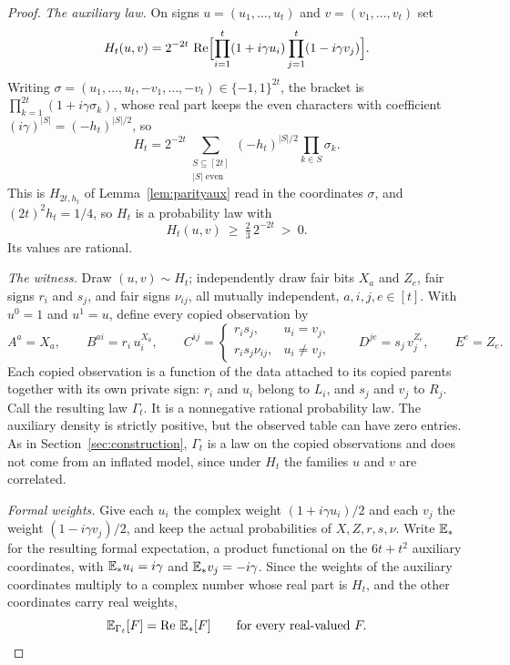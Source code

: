 \begin{proof}
\emph{The auxiliary law.} On signs $u=(u_1,\dots,u_t)$ and $v=(v_1,\dots,v_t)$ set
\begin{equation}\label{eq:Ht}
H_t(u,v)=2^{-2t}\,\operatorname{Re}\Bigl[\prod_{i=1}^t(1+i\gamma u_i)\prod_{j=1}^t(1-i\gamma v_j)\Bigr].
\end{equation}
Writing $\sigma=(u_1,\dots,u_t,-v_1,\dots,-v_t)\in\{-1,1\}^{2t}$, the bracket is $\prod_{k=1}^{2t}(1+i\gamma\sigma_k)$, whose real part keeps the even characters with coefficient $(i\gamma)^{|S|}=(-h_t)^{|S|/2}$, so
\[
H_t=2^{-2t}\sum_{\substack{S\subseteq[2t]\\|S|\text{ even}}}(-h_t)^{|S|/2}\prod_{k\in S}\sigma_k .
\]
This is $H_{2t,h_t}$ of Lemma~\ref{lem:parityaux} read in the coordinates $\sigma$, and $(2t)^2h_t=1/4$, so $H_t$ is a probability law with
\begin{equation}\label{eq:Htpos}
H_t(u,v)\ \ge\ \tfrac23\,2^{-2t}\ >\ 0 .
\end{equation}
Its values are rational.

\emph{The witness.} Draw $(u,v)\sim H_t$; independently draw fair bits $X_a$ and $Z_e$, fair signs $r_i$ and $s_j$, and fair signs $\nu_{ij}$, all mutually independent, $a,i,j,e\in[t]$. With $u^0=1$ and $u^1=u$, define every copied observation by
\begin{equation}\label{eq:pathwitness}
A^a=X_a,\qquad
B^{ai}=r_i\,u_i^{X_a},\qquad
C^{ij}=\begin{cases}r_is_j,&u_i=v_j,\\ r_is_j\nu_{ij},&u_i\ne v_j,\end{cases}\qquad
D^{je}=s_j\,v_j^{Z_e},\qquad
E^e=Z_e .
\end{equation}
Each copied observation is a function of the data attached to its copied parents together with its own private sign: $r_i$ and $u_i$ belong to $L_i$, and $s_j$ and $v_j$ to $R_j$. Call the resulting law $\Gamma_t$. It is a nonnegative rational probability law. The auxiliary density is strictly positive, but the observed table can have zero entries. As in Section~\ref{sec:construction}, $\Gamma_t$ is a law on the copied observations and does not come from an inflated model, since under $H_t$ the families $u$ and $v$ are correlated.

\emph{Formal weights.} Give each $u_i$ the complex weight $(1+i\gamma u_i)/2$ and each $v_j$ the weight $(1-i\gamma v_j)/2$, and keep the actual probabilities of $X,Z,r,s,\nu$. Write $\mathbb E_\ast$ for the resulting formal expectation, a product functional on the $6t+t^2$ auxiliary coordinates, with $\mathbb E_\ast u_i=i\gamma$ and $\mathbb E_\ast v_j=-i\gamma$. Since the weights of the auxiliary coordinates multiply to a complex number whose real part is $H_t$, and the other coordinates carry real weights,
\begin{equation}\label{eq:realpart}
\mathbb E_{\Gamma_t}[F]=\operatorname{Re}\,\mathbb E_\ast[F]\qquad\text{for every real-valued }F .
\end{equation}


\end{proof}
